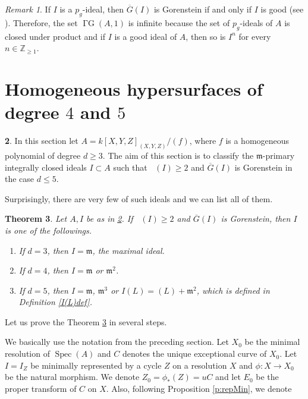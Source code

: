 \documentclass[12pt]{amsart}
\newtheorem{thm}{Theorem}[section]
\theoremstyle{definition}
\newtheorem{noname}[thm]{}
\theoremstyle{remark}
\newtheorem{rem}[thm]{Remark}
\numberwithin{equation}{section}
\DeclareMathOperator{\Spec}{Spec}
\DeclareMathOperator{\GG}{\Gamma G}
\DeclareMathOperator{\br}{\bar r}
\newcommand{\m}{\mathfrak m}
\newcommand{\Z}{\mathbb Z}
\renewcommand{\:}{\colon}
\newcommand{\ol}[1]{\overline {#1}}
\begin{document}
\begin{rem}\label{r:pginfty}
If $I$ is a $p_g$-ideal, then $\ol G(I)$ is Gorenstein if and only if $I$ is good (see \cite{OWY6}).
Therefore, the set $\GG(A,1)$ is infinite because the set of $p_g$-ideals of $A$ is closed under product and if $I$ is a good ideal of $A$, then so is $I^n$ for every $n\in \Z_{\ge 1}$. 
\end{rem}

\section{Homogeneous hypersurfaces of degree $4$ and $5$}


\begin{noname}\label{5;setting}  In this section let  $A = k[X,Y,Z]_{(X,Y,Z)}/ (f)$, 
where $f$ is a homogeneous polynomial of degree $d\ge 3$.
The aim of this section is to classify the $\m$-primary integrally closed ideals
 $I \subset A$ such that 
$\br(I) \ge 2$ and  $\overline{G}(I)$ is Gorenstein in the case $d\le 5$. 
\end{noname}

 Surprisingly, there are very few of such ideals and we can 
list all of them. 

\begin{thm}\label{Main: d-4,5} Let $A, I$ be as in \ref{5;setting}. 
If $\br(I) \ge 2$ and  $\overline{G}(I)$ is Gorenstein, then $I$ is 
one of the followings.
\begin{enumerate}
\item If $d=3$, then $I=\m$, the maximal ideal. 
\item If $d=4$, then $I=\m$ or $\m^2$.
\item If $d=5$, then $I= \m$, $\m^3$ or $I(L) = (L) +\m^2$, which is defined in Definition 
 \ref{I(L)def}.    
\end{enumerate}
\end{thm}
\par 
Let us prove the Theorem \ref{Main: d-4,5} in several steps. 
\par 
We basically use the notation from the preceding section. 
Let $X_0$ be the minimal resolution of $\Spec(A)$ and 
$C$ denotes the unique exceptional curve  of  $X_0$. 
Let $I = I_Z$ be minimally represented by a cycle $Z$ on a resolution $X$ and 
$\phi : X \to X_0$ be the natural morphism.  
We denote  $Z_0 = \phi_*(Z) = uC$ and let $E_0$ be the proper transform of $C$ on $X$.
Also, following Proposition \ref{p:repMin}, we denote 
\end{document}
